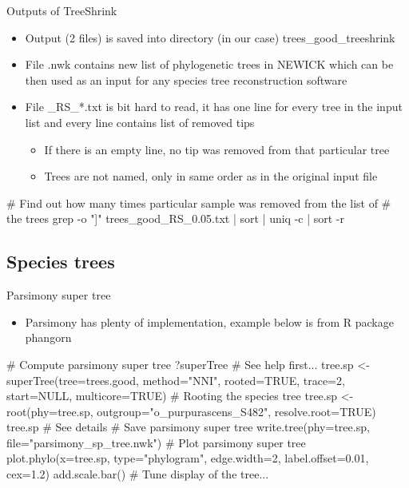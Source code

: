 \documentclass[compress, ucs, xelatex, 11pt, xcolor=x11names, aspectratio=169,
	hyperref={
		bookmarks=true,
		unicode=true,
		colorlinks=true,
		pdftitle={HybSeq course},
		plainpages=false,
		pdfauthor={Vojtech Zeisek},
		pdfsubject={Practical processing of HybSeq target enrichment sequencing data on computing grids like MetaCentrum},
		pdfcreator={XeLaTeX},
		pdfkeywords={BASH, command line, GNU, HybSeq, Linux, MetaCentrum, sequencing shell, target enrichment},
		linkcolor=Turquoise4, %
		anchorcolor=DodgerBlue4, %
		citecolor=DodgerBlue4, %
		filecolor=DodgerBlue4, %
		menucolor=Tan4, %
		urlcolor=DarkOliveGreen4, %
		pdftex},
	url={hyphens, lowtilde} %
	]{beamer}
\renewcommand{\texttt}[1]{\colorbox{Cornsilk2}{{\ttfamily #1}}}
\begin{document}
\begin{frame}[fragile]{Outputs of TreeShrink}
	\begin{itemize}
		\item Output (2 files) is saved into directory (in our case) \texttt{trees\_good\_treeshrink}
		\item File \texttt{*.nwk} contains new list of phylogenetic trees in \texttt{NEWICK} which can be then used as an input for any species tree reconstruction software
		\item File \texttt{*\_RS\_*.txt} is bit hard to read, it has one line for every tree in the input list and every line contains list of removed tips
		\begin{itemize}
			\item If there is an empty line, no tip was removed from that particular tree
			\item Trees are not named, only in same order as in the original input file
		\end{itemize}
	\end{itemize}
	\begin{bashcode}
    # Find out how many times particular sample was removed from the list of
    # the trees
    grep -o "\<[[:graph:]]\+\>" trees_good_RS_0.05.txt | sort | uniq -c |
      sort -r
	\end{bashcode}
\end{frame}

\subsection{Species trees}

\begin{frame}[fragile]{Parsimony super tree}
	\begin{itemize}
		\item Parsimony has plenty of implementation, example below is from \texttt{R} package \texttt{phangorn}
	\end{itemize}
	\begin{spluscode}
    # Compute parsimony super tree
    ?superTree # See help first...
    tree.sp <- superTree(tree=trees.good, method="NNI", rooted=TRUE,
      trace=2, start=NULL, multicore=TRUE)
    # Rooting the species tree
    tree.sp <- root(phy=tree.sp, outgroup="o_purpurascens_S482",
      resolve.root=TRUE)
    tree.sp # See details
    # Save parsimony super tree
    write.tree(phy=tree.sp, file="parsimony_sp_tree.nwk")
    # Plot parsimony super tree
    plot.phylo(x=tree.sp, type="phylogram", edge.width=2,
      label.offset=0.01, cex=1.2)
    add.scale.bar()
    # Tune display of the tree...
	\end{spluscode}
\end{frame}
\end{document}

